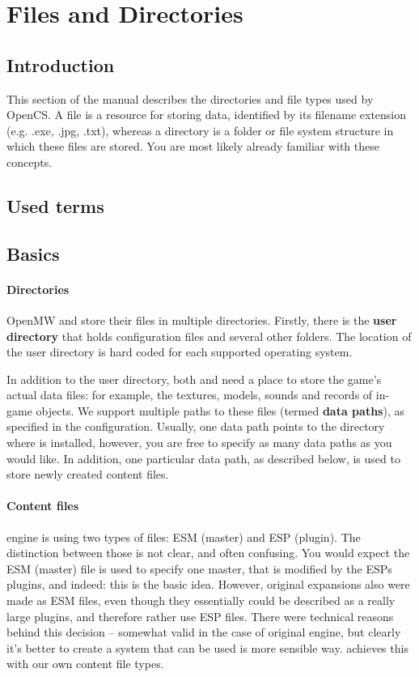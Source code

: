 \section{Files and Directories}
\subsection{Introduction}
This section of the manual describes the directories and file types used by OpenCS. A file is a resource for storing data, identified by its
filename extension (e.g. .exe, .jpg, .txt), whereas a directory is a folder or file system structure in which these files are stored. You
are most likely already familiar with these concepts.

\subsection{Used terms} %

\subsection{Basics}

\paragraph{Directories}
OpenMW and \OCS{} store their files in multiple directories. Firstly, there is the \textbf{user directory} that holds configuration
files and several other folders. The location of the user directory is hard coded for each supported operating system.

In addition to the user directory, both \OMW{} and \OCS{} need a place to store the game’s actual data files: for example, the 
textures, models, sounds and records of in-game objects. We support multiple paths to these files (termed \textbf{data paths}), 
as specified in the configuration. Usually, one data path points to the directory where \MW{} is installed, however, you are 
free to specify as many data paths as you would like. In addition, one particular data path, as described below, is used to store 
newly created content files.

\paragraph{Content files}
\BS{} \MW{} engine is using two types of files: ESM (master) and ESP (plugin). The distinction between those
is not clear, and often confusing. You would expect the ESM (master) file is used to specify one master, that is modified by the ESPs plugins,
and indeed: this is the basic idea. However, original expansions also were made as ESM files, even though they essentially could be
described as a really large plugins, and therefore rather use ESP files. There were technical reasons behind this decision -- somewhat valid
in the case of original engine, but clearly it's better to create a system that can be used is more sensible way. \OMW{} achieves
this with our own content file types.

